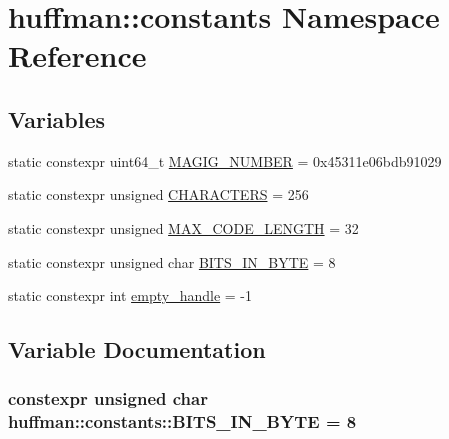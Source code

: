 \hypertarget{namespacehuffman_1_1constants}{}\section{huffman\+:\+:constants Namespace Reference}
\label{namespacehuffman_1_1constants}
\subsection*{Variables}
\begin{DoxyCompactItemize}
\item 
static constexpr uint64\+\_\+t \hyperlink{namespacehuffman_1_1constants_adc8c2b0fcb5eadd26aa1f9535d95ab6e}{M\+A\+G\+I\+G\+\_\+\+N\+U\+M\+B\+ER} = 0x45311e06bdb91029
\item 
static constexpr unsigned \hyperlink{namespacehuffman_1_1constants_a263e0c34ff9ba6afe32efbc1eeabdf88}{C\+H\+A\+R\+A\+C\+T\+E\+RS} = 256
\item 
static constexpr unsigned \hyperlink{namespacehuffman_1_1constants_a9bbdd97bbc9095087fd624645d1082fe}{M\+A\+X\+\_\+\+C\+O\+D\+E\+\_\+\+L\+E\+N\+G\+TH} = 32
\item 
static constexpr unsigned char \hyperlink{namespacehuffman_1_1constants_a89cadeae06b1c8968a40bbde1e1929b6}{B\+I\+T\+S\+\_\+\+I\+N\+\_\+\+B\+Y\+TE} = 8
\item 
static constexpr int \hyperlink{namespacehuffman_1_1constants_a807803821447a0285e3dfd195ee698e7}{empty\+\_\+handle} = -\/1
\end{DoxyCompactItemize}


\subsection{Variable Documentation}
\subsubsection[{\texorpdfstring{B\+I\+T\+S\+\_\+\+I\+N\+\_\+\+B\+Y\+TE}{BITS_IN_BYTE}}]{\setlength{\rightskip}{0pt plus 5cm}constexpr unsigned char huffman\+::constants\+::\+B\+I\+T\+S\+\_\+\+I\+N\+\_\+\+B\+Y\+TE = 8\hspace{0.3cm}{\ttfamily [static]}}\hypertarget{namespacehuffman_1_1constants_a89cadeae06b1c8968a40bbde1e1929b6}{}\label{namespacehuffman_1_1constants_a89cadeae06b1c8968a40bbde1e1929b6}


